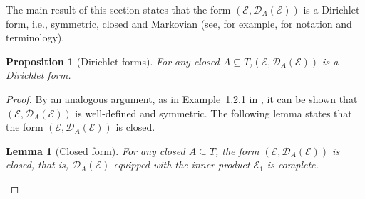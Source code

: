 \documentclass[11pt]{amsart}
\numberwithin{equation}{section}
\newtheorem{lemma}[definition]{Lemma}
\newtheorem{proposition}[definition]{Proposition}
\begin{document}
{The main result of this section states that
the {form
$(\mathcal E,\mathcal D_A(\mathcal E))$ is a
{{\it} Dirichlet form}}, i.e., symmetric, closed and
Markovian (see, for example,
\cite{FukushimaOshimaTakeda1994} for notation
and terminology).

\begin{proposition}[Dirichlet forms]
For any closed {$A\subseteq T$},\label{P:00}
$(\mathcal E,\mathcal D_A(\mathcal E))$
is a Dirichlet form.
\end{proposition}{\smallskip}

\begin{proof}
By an analogous argument, as in Example~1.2.1 in
\cite{FukushimaOshimaTakeda1994}, it can be shown that $({\mathcal E},{\mathcal D}_A({\mathcal E}))$ is
well-defined and symmetric.
The following lemma states that the form $({\mathcal E},{\mathcal D}_A(\mathcal E))$ is closed.
\begin{lemma}[Closed form] For any closed $A\subseteq T$,
\label{L:EDstarclosed}
the form
$({\mathcal E},{\mathcal D}_A(\mathcal E))$
is closed, that is, $\mathcal D_A(\mathcal E)$ equipped with
the inner product $\mathcal E_1$ is complete.
\end{lemma}{\smallskip}


\end{proof}}
\end{document}
